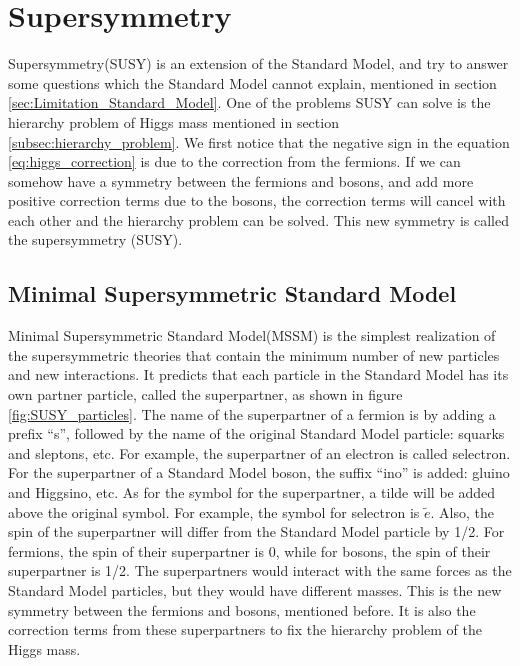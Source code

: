 \section{Supersymmetry}
Supersymmetry(SUSY) is an extension of the Standard Model, and try to answer some questions which the Standard Model cannot explain, mentioned in section \ref{sec:Limitation_Standard_Model}.
One of the problems SUSY can solve is the hierarchy problem of Higgs mass mentioned in section \ref{subsec:hierarchy_problem}.
We first notice that the negative sign in the equation \ref{eq:higgs_correction} is due to the correction from the fermions.
If we can somehow have a symmetry between the fermions and bosons, and add more positive correction terms due to the bosons, the correction terms will cancel with each other and the hierarchy problem can be solved.
This new symmetry is called the supersymmetry (SUSY).

\subsection{Minimal Supersymmetric Standard Model}
Minimal Supersymmetric Standard Model(MSSM) is the simplest realization of the supersymmetric theories that contain the minimum number of new particles and new interactions.
It predicts that each particle in the Standard Model has its own partner particle, called the superpartner, as shown in figure \ref{fig:SUSY_particles}.
The name of the superpartner of a fermion is by adding a prefix ``s'', followed by the name of the original Standard Model particle: squarks and sleptons, etc.
For example, the superpartner of an electron is called selectron.
For the superpartner of a Standard Model boson, the suffix ``ino'' is added: gluino and Higgsino, etc.
As for the symbol for the superpartner, a tilde will be added above the original symbol.
For example, the symbol for selectron is $\tilde{e}$.
Also, the spin of the superpartner will differ from the Standard Model particle by 1/2.
For fermions, the spin of their superpartner is 0, while for bosons, the spin of their superpartner is 1/2.
The superpartners would interact with the same forces as the Standard Model particles, but they would have different masses.
This is the new symmetry between the fermions and bosons, mentioned before.
It is also the correction terms from these superpartners to fix the hierarchy problem of the Higgs mass.

